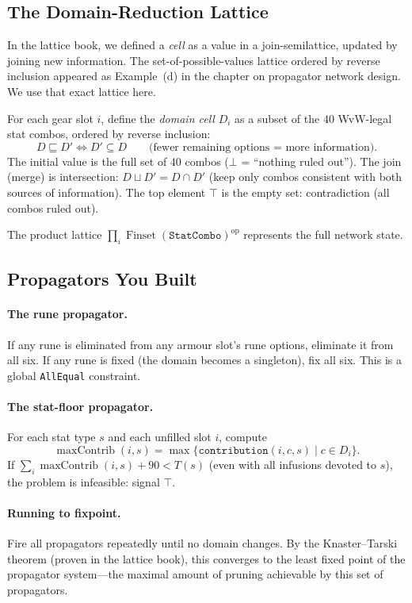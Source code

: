 \documentclass[11pt, a4paper, oneside]{book}
\newcommand{\Finset}{\operatorname{Finset}}
\newcommand{\maxContrib}{\operatorname{maxContrib}}
\begin{document}
\subsection{The Domain-Reduction Lattice}

\begin{crossrefbox}
In the lattice book, we defined a \emph{cell} as a value in a
join-semilattice, updated by joining new information.  The set-of-possible-values
lattice ordered by reverse inclusion appeared as Example~(d) in the
chapter on propagator network design.  We use that exact lattice here.
\end{crossrefbox}

For each gear slot $i$, define the \emph{domain cell} $D_i$ as a subset of
the 40 WvW-legal stat combos, ordered by reverse inclusion:
\[
  D \sqsubseteq D' \iff D' \subseteq D
  \qquad\text{(fewer remaining options = more information)}.
\]
The initial value is the full set of 40 combos ($\bot$ = ``nothing ruled out'').
The join (merge) is intersection: $D \sqcup D' = D \cap D'$
(keep only combos consistent with both sources of information).  The top element
$\top$ is the empty set: contradiction (all combos ruled out).

The product lattice $\prod_i \Finset(\texttt{StatCombo})^{\mathrm{op}}$
represents the full network state.

\subsection{Propagators You Built}

\paragraph{The rune propagator.}
If any rune is eliminated from any armour slot's rune options, eliminate it
from all six.  If any rune is fixed (the domain becomes a singleton), fix all
six.  This is a global \texttt{AllEqual} constraint.

\paragraph{The stat-floor propagator.}
For each stat type $s$ and each unfilled slot $i$, compute
\[
  \maxContrib(i, s) = \max\{\texttt{contribution}(i, c, s) \mid c \in D_i\}.
\]
If $\sum_i \maxContrib(i, s) + 90 < T(s)$ (even with all infusions devoted
to $s$), the problem is infeasible: signal $\top$.

\paragraph{Running to fixpoint.}
Fire all propagators repeatedly until no domain changes.  By the
Knaster--Tarski theorem (proven in the lattice book), this converges to the
least fixed point of the propagator system---the maximal amount of pruning
achievable by this set of propagators.
\end{document}
